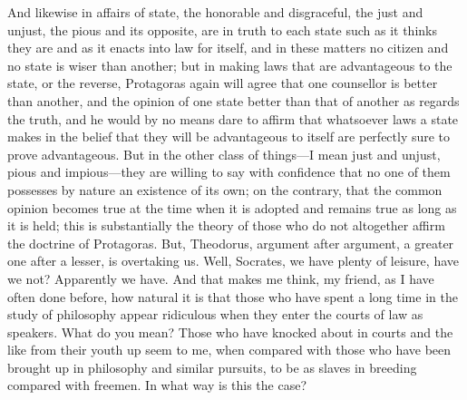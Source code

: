 \documentclass[letterpaper,12pt]{article}
\newcommand{\stephpag}[1]{\marginnote{\small\itshape\fontfamily{ppl}\selectfont #1}}
\begin{document}
\begin{drama}
And likewise in affairs of state, the honorable and disgraceful, the just and unjust, the pious and its opposite, are in truth to each state such as it thinks they are and as it enacts into law for itself, and in these matters no citizen and no state is wiser than another; but in making laws that are advantageous to the state, or the reverse, Protagoras again will agree that one counsellor is better than another, and the opinion of one state better than that of another as regards the truth, \stephpag{b} and he would by no means dare to affirm that whatsoever laws a state makes in the belief that they will be advantageous to itself are perfectly sure to prove advantageous. But in the other class of things—I mean just and unjust, pious and impious—they are willing to say with confidence that no one of them possesses by nature an existence of its own; on the contrary, that the common opinion becomes true at the time when it is adopted and remains true as long as it is held; this is substantially the theory of those who do not altogether affirm the doctrine of Protagoras. But, Theodorus, argument after argument, \stephpag{c} a greater one after a lesser, is overtaking us.
\theodorusspeaks
Well, Socrates, we have plenty of leisure, have we not?
\socratesspeaks
Apparently we have. And that makes me think, my friend, as I have often done before, how natural it is that those who have spent a long time in the study of philosophy appear ridiculous when they enter the courts of law as speakers.
\theodorusspeaks
What do you mean?
\socratesspeaks
Those who have knocked about in courts and the like from their youth up seem to me, when compared with those who have been brought up in philosophy \stephpag{d} and similar pursuits, to be as slaves in breeding compared with freemen.
\theodorusspeaks
In what way is this the case?
\socratesspeaks

\end{drama}
\end{document}
